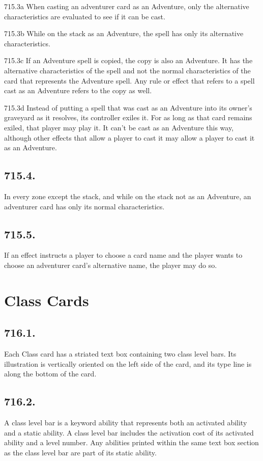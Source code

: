 715.3a When casting an adventurer card as an Adventure, only the alternative characteristics are evaluated to see if it can be cast.

715.3b While on the stack as an Adventure, the spell has only its alternative characteristics.

715.3c If an Adventure spell is copied, the copy is also an Adventure. It has the alternative characteristics of the spell and not the normal characteristics of the card that represents the Adventure spell. Any rule or effect that refers to a spell cast as an Adventure refers to the copy as well.

715.3d Instead of putting a spell that was cast as an Adventure into its owner’s graveyard as it resolves, its controller exiles it. For as long as that card remains exiled, that player may play it. It can’t be cast as an Adventure this way, although other effects that allow a player to cast it may allow a player to cast it as an Adventure.

\subsection*{715.4.}
In every zone except the stack, and while on the stack not as an Adventure, an adventurer card has only its normal characteristics.

\subsection*{715.5.}
If an effect instructs a player to choose a card name and the player wants to choose an adventurer card’s alternative name, the player may do so.

\section{Class Cards}
\subsection*{716.1.}
Each Class card has a striated text box containing two class level bars. Its illustration is vertically oriented on the left side of the card, and its type line is along the bottom of the card.

\subsection*{716.2.}
A class level bar is a keyword ability that represents both an activated ability and a static ability. A class level bar includes the activation cost of its activated ability and a level number. Any abilities printed within the same text box section as the class level bar are part of its static ability.

